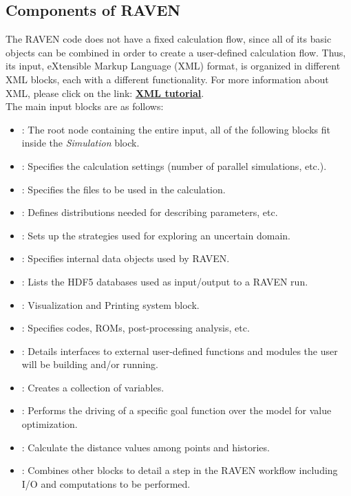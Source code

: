 \subsection{Components of RAVEN}
\label{sub:InputComponents}
The RAVEN code does not have a fixed calculation flow, since all of its basic
objects can be combined in order to create a user-defined calculation flow.
%
Thus, its input, eXtensible Markup Language (XML) format, is organized in different XML blocks, each with a
different functionality. For more information about XML, please click on the link:
\href{https://www.w3schools.com/xml/default.asp}{\textbf{XML tutorial}}.
%
\\The main input blocks are as follows:
\begin{itemize}
  \item {}: The root node containing the
  entire input, all of
  the following blocks fit inside the \emph{Simulation} block.
  \item {}: Specifies the calculation
  settings (number of parallel simulations, etc.).
  \item {}: Specifies the files to be
  used in the calculation.
  \item {}: Defines distributions
  needed for describing parameters, etc.
  \item {}: Sets up the strategies used for
  exploring an uncertain domain.
  \item {}: Specifies internal data objects
  used by RAVEN.
  \item {}: Lists the HDF5 databases used
  as input/output to a
  RAVEN run.
  \item {}: Visualization and
  Printing system block.
  \item {}: Specifies codes, ROMs,
  post-processing analysis, etc.
  \item {}: Details interfaces to external
  user-defined functions and modules the user will be building and/or running.
  \item {}: Creates a collection of variables.
  \item {}: Performs the driving of a specific goal function over
  the model for value optimization.
  \item {}: Calculate the distance values among points and histories.
  \item {}: Combines other blocks to detail a
  step in the RAVEN workflow including I/O and computations to be performed.
\end{itemize}

